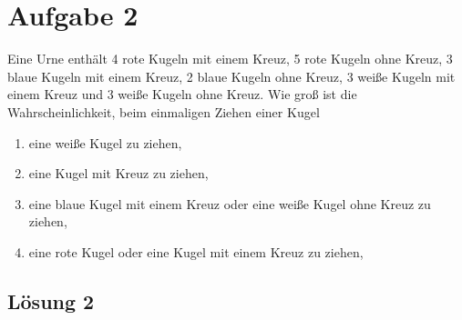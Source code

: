 \documentclass[main.tex]{subfiles}
\begin{document}
\section{Aufgabe 2}
Eine Urne enthält 4 rote Kugeln mit einem Kreuz, 5 rote Kugeln ohne Kreuz, 3 blaue Kugeln mit einem Kreuz, 2 blaue Kugeln ohne Kreuz, 3 weiße Kugeln mit einem Kreuz und 3 weiße Kugeln ohne Kreuz.
Wie groß ist die Wahrscheinlichkeit, beim einmaligen Ziehen einer Kugel
\begin{enumerate}
    \item eine weiße Kugel zu ziehen,
    \item eine Kugel mit Kreuz zu ziehen,
    \item eine blaue Kugel mit einem Kreuz oder eine weiße Kugel ohne Kreuz zu ziehen,
    \item eine rote Kugel oder eine Kugel mit einem Kreuz zu ziehen,
\end{enumerate}

\subsection{Lösung 2}
\end{document}
